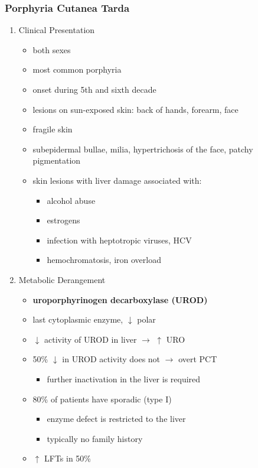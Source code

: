 \documentclass[12pt]{scrartcl}
\begin{document}
\subsubsection{Porphyria Cutanea Tarda}
\label{sec:org8c8361d}
\begin{enumerate}
\item Clinical Presentation
\label{sec:org341c3eb}
\begin{itemize}
\item both sexes
\item most common porphyria
\item onset during 5th and sixth decade
\item lesions on sun-exposed skin: back of hands, forearm, face
\item fragile skin
\item subepidermal bullae, milia, hypertrichosis of the face, patchy pigmentation
\item skin lesions with liver damage associated with:
\begin{itemize}
\item alcohol abuse
\item estrogens
\item infection with heptotropic viruses, HCV
\item hemochromatosis, iron overload
\end{itemize}
\end{itemize}
\item Metabolic Derangement
\label{sec:orgf21753d}
\begin{itemize}
\item \textbf{uroporphyrinogen decarboxylase (UROD)}
\item last cytoplasmic enzyme, \(\downarrow\) polar
\item \(\downarrow\) activity of UROD in liver \(\to\) \(\uparrow\) URO
\item 50\% \(\downarrow\) in UROD activity does not \(\to\) overt PCT
\begin{itemize}
\item further inactivation in the liver is required
\end{itemize}
\item 80\% of patients have sporadic (type I)
\begin{itemize}
\item enzyme defect is restricted to the liver
\item typically no family history
\end{itemize}
\item \(\uparrow\) LFTs in 50\%

\end{itemize}
\end{enumerate}
\end{document}
